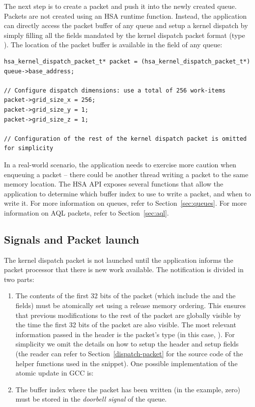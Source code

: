 \documentclass[oneside]{book}
\begin{document}
The next step is to create a packet and push it into the newly created
queue. Packets are not created using an HSA runtime function. Instead, the
application can directly access the packet buffer of any queue and setup a
kernel dispatch by simply filling all the fields mandated by the kernel dispatch
packet format (type ). The location of the
packet buffer is available in the  field of any
queue:
\begin{lstlisting}
hsa_kernel_dispatch_packet_t* packet = (hsa_kernel_dispatch_packet_t*) queue->base_address;

// Configure dispatch dimensions: use a total of 256 work-items
packet->grid_size_x = 256;
packet->grid_size_y = 1;
packet->grid_size_z = 1;

// Configuration of the rest of the kernel dispatch packet is omitted for simplicity
\end{lstlisting}

In a real-world scenario, the application needs to exercise more caution when
enqueuing a packet -- there could be another thread writing a packet to the same
memory location. The HSA API exposes several functions that allow the
application to determine which buffer index to use to write a packet, and when to
write it. For more information on queues, refer to Section~\ref{sec:queues}. For
more information on AQL packets, refer to Section~\ref{sec:aql}.

\subsection{Signals and Packet launch}
The kernel dispatch packet is not launched until the application informs the
packet processor that there is new work available. The notification is divided
in two parts:

\begin{enumerate}
\item The contents of the first 32 bits of the packet (which include the
   and the
   fields) must be atomically set
  using a release memory ordering. This ensures that previous modifications to
  the rest of the packet are globally visible by the time the first 32 bits of
  the packet are also visible. The most relevant information passed in the
  header is the packet's type (in this case,
  ). For simplicity we omit the details
  on how to setup the header and setup fields (the reader can refer to
  Section~\ref{dispatch-packet} for the source code of the helper functions used
  in the snippet).  One possible implementation of the atomic update in GCC
  is:
\item The buffer index where the packet has been written (in the example, zero)
must be stored in the \textit{doorbell signal} of the queue.
\end{enumerate}
\end{document}
